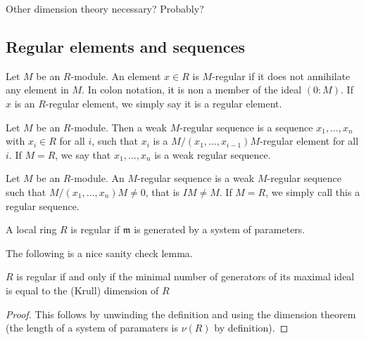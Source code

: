 Other dimension theory necessary? Probably?

\subsection{Regular elements and sequences}

\begin{definition}
  \label{def:reg_elt}
  Let $M$ be an $R$-module.
  An element $x \in R$ is $M$-regular if it does 
  not annihilate any element in $M$.
  In colon notation, it is non a member of the ideal
  $( 0 : M )$.
  If $x$ is an $R$-regular element, we simply say it is 
  a regular element.
\end{definition}

\begin{definition}
  \label{def:weak_reg_seq}
  Let $M$ be an $R$-module.
  Then a weak $M$-regular sequence
  is a sequence $x_1, \ldots, x_n$ 
  with $x_i \in R$ for all $i$,
  such that 
  $x_i$ is a
  $M / (x_1, \ldots, x_{i-1}) M$-regular
  element for all $i$.
  If $M = R$, we say that $x_1, \ldots, x_n$
  is a weak regular sequence. 
\end{definition}

\begin{definition}
  \label{def:reg_seq}
  Let $M$ be an $R$-module.
  An $M$-regular sequence is a weak $M$-regular sequence
  such that $M / (x_1, \ldots, x_n) M \neq 0$, that is $IM \neq M$.
  If $M = R$, we simply call this a regular sequence.
\end{definition}

\begin{definition}
  \label{def:reg_loc}
  A local ring $R$ is regular if 
  $\mathfrak{m}$ is generated by a system of parameters.
\end{definition}

The following is a nice sanity check lemma.

\begin{lemma}
    \label{lem:reg_maximal_dim_generators}
    \(R\) is regular if and only if 
    the minimal number of generators of its maximal
    ideal is equal to the (Krull) dimension of \(R\)
\end{lemma}

\begin{proof}
    This follows by unwinding the definition 
    and using the dimension theorem 
    (the length of a system of paramaters is \(\nu(R)\)
    by definition).
\end{proof}

